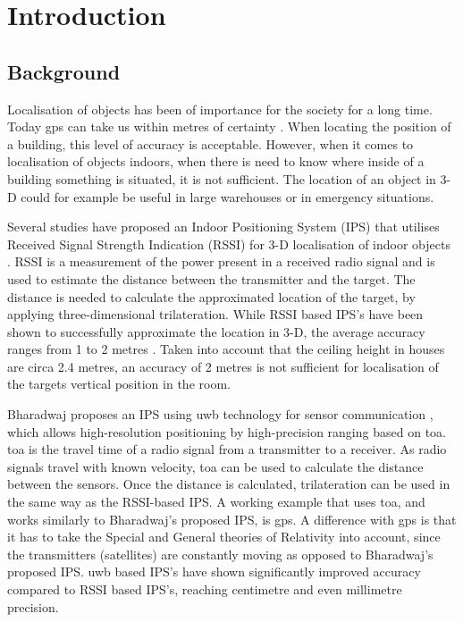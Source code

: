 
\section{Introduction}
	\subsection{Background}
		Localisation of objects has been of importance for the society for a long time.  Today \gls{gps} can take us within metres of certainty \cite{_gps.gov:_2015}. When locating the position of a building, this level of accuracy is acceptable. However, when it comes to localisation of objects indoors, when there is need to know where inside of a building something is situated, it is not sufficient. The location of an object in 3-D could for example be useful in large warehouses or in emergency situations.

		Several studies have proposed an Indoor Positioning System (IPS) that utilises Received Signal Strength Indication (RSSI) for 3-D localisation of indoor objects
		\cite{lee_3d-localization---mobile-beacon.pdf_2012,kim_mobile_2010,hassan_indoor_2010}. RSSI is a measurement of the power present in a received radio signal and is used to estimate the distance between the transmitter and the target. The distance is needed to calculate the approximated location of the target, by applying three-dimensional trilateration. While RSSI based IPS's have been shown to successfully approximate the location in 3-D, the average accuracy ranges from 1 to 2 metres \cite{hassan_indoor_2010,luo_comparative_2011}. Taken into account that the ceiling height in houses are circa 2.4 metres, an accuracy of 2 metres is not sufficient for localisation of the targets vertical position in the room.

		Bharadwaj proposes an IPS using \gls{uwb} technology for sensor communication
		\cite{bharadwaj_ultrawideband-based_2014}, which allows high-resolution positioning by high-precision ranging based on \gls{toa}. \gls{toa} is the travel time of a radio signal from a transmitter to a receiver. As radio signals travel with known velocity, \gls{toa} can be used to calculate the distance between the sensors. Once the distance is calculated, trilateration can be used in the same way as the RSSI-based IPS. A working example that uses \gls{toa}, and works similarly to Bharadwaj's proposed IPS, is \gls{gps}. A difference with \gls{gps} is that it has to take the Special and General theories of Relativity \cite{einstein_relativity_1920} into account, since the transmitters (satellites) are constantly moving \cite{_gps_????} as opposed to Bharadwaj's proposed IPS. \gls{uwb} based IPS's have shown significantly improved accuracy compared to RSSI based IPS's, reaching centimetre\cite{bharadwaj_ultrawideband-based_2014} and even millimetre\cite{zhang_real-time_2009} precision.

